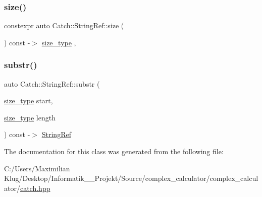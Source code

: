 \mbox{\label{class_catch_1_1_string_ref_acb22719801de2b64361b4c283080d4e5}} 
\subsubsection{\texorpdfstring{size()}{size()}}
{\footnotesize\ttfamily constexpr auto Catch\+::\+String\+Ref\+::size (\begin{DoxyParamCaption}{ }\end{DoxyParamCaption}) const -\/$>$ \mbox{\hyperlink{class_catch_1_1_string_ref_a06b4db8fc82b197004291cf370b2ba7c}{size\+\_\+type}} \hspace{0.3cm}{\ttfamily [inline]}, {\ttfamily [noexcept]}}

\mbox{\label{class_catch_1_1_string_ref_a594bc3e10ffad77df92f7d1a4c99d7ff}} 
\subsubsection{\texorpdfstring{substr()}{substr()}}
{\footnotesize\ttfamily auto Catch\+::\+String\+Ref\+::substr (\begin{DoxyParamCaption}\item[{\mbox{\hyperlink{class_catch_1_1_string_ref_a06b4db8fc82b197004291cf370b2ba7c}{size\+\_\+type}}}]{start,  }\item[{\mbox{\hyperlink{class_catch_1_1_string_ref_a06b4db8fc82b197004291cf370b2ba7c}{size\+\_\+type}}}]{length }\end{DoxyParamCaption}) const -\/$>$  \mbox{\hyperlink{class_catch_1_1_string_ref}{String\+Ref}}\hspace{0.3cm}{\ttfamily [noexcept]}}



The documentation for this class was generated from the following file\+:\begin{DoxyCompactItemize}
\item 
C\+:/\+Users/\+Maximilian Klug/\+Desktop/\+Informatik\+\_\+\_\+\+Projekt/\+Source/complex\+\_\+calculator/complex\+\_\+calculator/\mbox{\hyperlink{catch_8hpp}{catch.\+hpp}}\end{DoxyCompactItemize}
